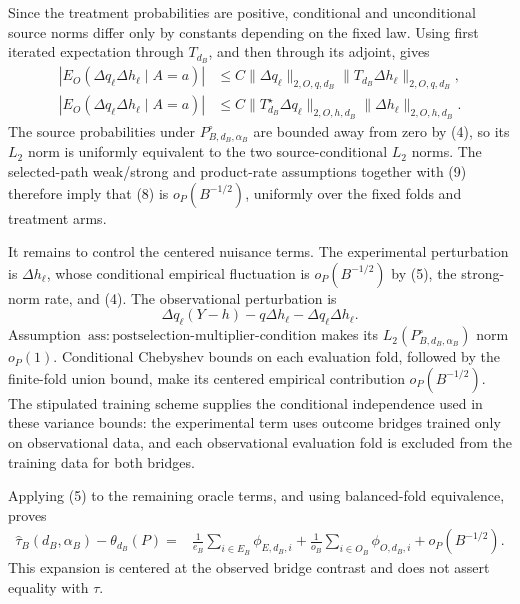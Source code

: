 Since the treatment probabilities are positive, conditional and unconditional source norms differ only by constants depending on the fixed law.  Using first iterated expectation through \(T_{d_B}\), and then through its adjoint, gives
\[
\begin{aligned}
 |E_O(\Delta q_\ell\Delta h_\ell\mid A=a)|
 &\le C\|\Delta q_\ell\|_{2,O,q,d_B}
       \|T_{d_B}\Delta h_\ell\|_{2,O,q,d_B},\\
 |E_O(\Delta q_\ell\Delta h_\ell\mid A=a)|
 &\le C\|T_{d_B}^{\star}\Delta q_\ell\|_{2,O,h,d_B}
       \|\Delta h_\ell\|_{2,O,h,d_B}.
\end{aligned} \tag{9}
\]
The source probabilities under \(P_{B,d_B,\alpha_B}^{\circ}\) are bounded away from zero by (4), so its \(L_2\) norm is uniformly equivalent to the two source-conditional \(L_2\) norms.  The selected-path weak/strong and product-rate assumptions together with (9) therefore imply that (8) is \(o_P(B^{-1/2})\), uniformly over the fixed folds and treatment arms.

It remains to control the centered nuisance terms.  The experimental perturbation is \(\Delta h_\ell\), whose conditional empirical fluctuation is \(o_P(B^{-1/2})\) by (5), the strong-norm rate, and (4).  The observational perturbation is
\[
 \Delta q_\ell(Y-h)-q\Delta h_\ell-\Delta q_\ell\Delta h_\ell. \tag{10}
\]
Assumption~\(\mathrm{ass{:}postselection\text{-}multiplier\text{-}condition}\) makes its \(L_2(P_{B,d_B,\alpha_B}^{\circ})\) norm \(o_P(1)\).  Conditional Chebyshev bounds on each evaluation fold, followed by the finite-fold union bound, make its centered empirical contribution \(o_P(B^{-1/2})\).  The stipulated training scheme supplies the conditional independence used in these variance bounds: the experimental term uses outcome bridges trained only on observational data, and each observational evaluation fold is excluded from the training data for both bridges.

Applying (5) to the remaining oracle terms, and using balanced-fold equivalence, proves
\[
\begin{aligned}
 \widehat\tau_B(d_B,\alpha_B)-\theta_{d_B}(P)
 ={}&\frac1{e_B}\sum_{i\in E_B}\phi_{E,d_B,i}
 +\frac1{o_B}\sum_{i\in O_B}\phi_{O,d_B,i}
 +o_P(B^{-1/2}).
\end{aligned} \tag{11}
\]
This expansion is centered at the observed bridge contrast and does not assert equality with \(\tau\).

